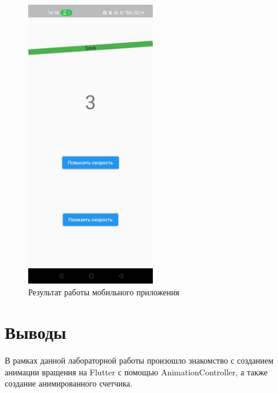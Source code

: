 \documentclass[a4paper, 14pt]{extarticle}
\begin{document}
\begin{figure}[H]
\centering
\includegraphics[width=0.5\textwidth]{images/res1.jpg}
\caption{Результат работы мобильного приложения}
\label{fig:img1}
\end{figure}


\section{Выводы}
В рамках данной лабораторной работы произошло знакомство с созданием анимации вращения на Flutter с помощью AnimationController, а также создание анимированного счетчика.
\end{document}
